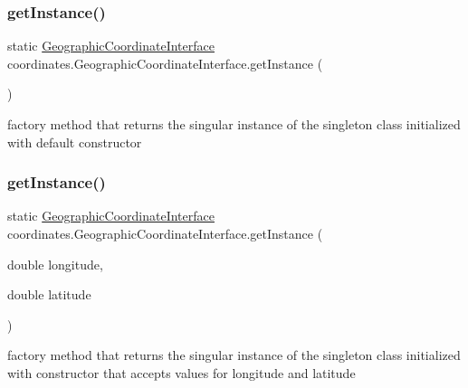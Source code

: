 \subsubsection{\texorpdfstring{get\+Instance()}{getInstance()}\hspace{0.1cm}{\footnotesize\ttfamily [1/3]}}
{\footnotesize\ttfamily static \hyperlink{classcoordinates_1_1_geographic_coordinate_interface}{Geographic\+Coordinate\+Interface} coordinates.\+Geographic\+Coordinate\+Interface.\+get\+Instance (\begin{DoxyParamCaption}{ }\end{DoxyParamCaption})\hspace{0.3cm}{\ttfamily [static]}}



factory method that returns the singular instance of the singleton class initialized with default constructor 

\mbox{\label{classcoordinates_1_1_geographic_coordinate_interface_acb73fce8bcd43035599dd462dbee2509}} 
\subsubsection{\texorpdfstring{get\+Instance()}{getInstance()}\hspace{0.1cm}{\footnotesize\ttfamily [2/3]}}
{\footnotesize\ttfamily static \hyperlink{classcoordinates_1_1_geographic_coordinate_interface}{Geographic\+Coordinate\+Interface} coordinates.\+Geographic\+Coordinate\+Interface.\+get\+Instance (\begin{DoxyParamCaption}\item[{double}]{longitude,  }\item[{double}]{latitude }\end{DoxyParamCaption})\hspace{0.3cm}{\ttfamily [static]}}



factory method that returns the singular instance of the singleton class initialized with constructor that accepts values for longitude and latitude 


